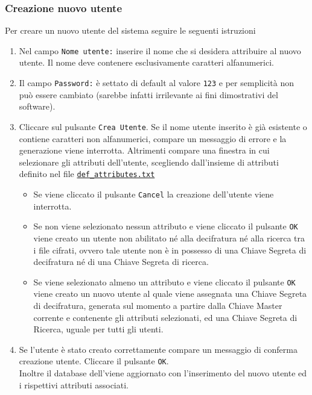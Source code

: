 \documentclass[a4paper,twoside,10pt,openany]{scrbook}
\begin{document}
\subsubsection{Creazione nuovo utente}\label{sec:creazione_utente}
Per creare un nuovo utente del sistema seguire le seguenti istruzioni
\begin{enumerate}
 \item Nel campo \texttt{Nome utente:} inserire il nome che si desidera attribuire al nuovo utente. 
       Il nome deve contenere esclusivamente caratteri alfanumerici.
 \item Il campo \texttt{Password:} è settato di default al valore \texttt{123} 
       e per semplicità non può essere cambiato (sarebbe infatti irrilevante ai fini dimostrativi del software).
 \item Cliccare sul pulsante \texttt{Crea Utente}.
       Se il nome utente inserito è già esistente o contiene caratteri non alfanumerici, 
       compare un messaggio di errore e la generazione viene interrotta.
       Altrimenti compare una finestra in cui selezionare gli attributi dell'utente, scegliendo dall'insieme di attributi definito nel file \texttt{\hyperref[sec:file_attributes]{def\_attributes.txt}}
       \begin{itemize}
        \item Se viene cliccato il pulsante \texttt{Cancel} la creazione dell'utente viene interrotta.
        \item Se non viene selezionato nessun attributo e viene cliccato il pulsante \texttt{OK} viene creato un utente non abilitato né alla decifratura né alla ricerca tra i file cifrati, ovvero tale utente non è in possesso di una Chiave Segreta di decifratura né di una Chiave Segreta di ricerca.
        \item Se viene selezionato almeno un attributo e viene cliccato il pulsante \texttt{OK} viene creato un nuovo utente al quale viene assegnata una Chiave Segreta di decifratura, generata sul momento a partire dalla Chiave Master corrente e contenente gli attributi selezionati, ed una Chiave Segreta di Ricerca, uguale per tutti gli utenti.
       \end{itemize}
 \item Se l'utente è stato creato correttamente compare un messaggio di conferma creazione utente. Cliccare il pulsante \texttt{OK}.\\
       Inoltre il database dell'\auth viene aggiornato con l'inserimento del nuovo utente ed i rispettivi attributi associati.
\end{enumerate}
\end{document}
